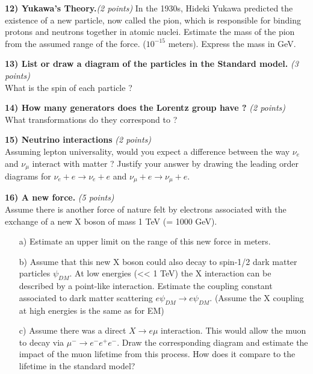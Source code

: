 {\vspace*{1.5in}

\textbf{12) Yukawa’s Theory.}\hfill \textit{(2 points)}
In the 1930s, Hideki Yukawa predicted the existence of a new particle, now called the pion, which is responsible for binding protons and neutrons together in atomic nuclei. 
Estimate the mass of the pion from the assumed range of the force. ($10^{-15}$ meters). 
Express the mass in GeV.

\clearpage



\textbf{13) List or draw a diagram of the particles in the Standard model. } \hfill \textit{(3 points)}\\
What is the spin of each particle ?

\vspace*{3in}

\textbf{14)  How many generators does the Lorentz group have ? }\hfill \textit{(2 points)}\\
What transformations do they correspond to ?

\vspace*{2in}

\textbf{15) Neutrino interactions } \hfill \textit{(2 points)}\\
Assuming lepton universality, would you expect a difference between the way $\nu_e$ and $\nu_\mu$ interact with matter ?
Justify your answer by drawing the leading order diagrams for $\nu_e + e \rightarrow \nu_e + e$  and $\nu_\mu + e \rightarrow \nu_\mu + e$.

\vspace*{0.25in}


\clearpage

\textbf{16) A new force. } \hfill \textit{(5 points)}\\
Assume there is another force of nature felt by electrons associated with the exchange of a new X boson of mass 1 TeV (= 1000 GeV).
\begin{itemize}
\item[a)]{ Estimate an upper limit on the range of this new force in meters.
\vspace{2in}
}
\item[b)]{ Assume that this new X boson could also decay to spin-1/2 dark matter particles $\psi_{DM}$. At low energies (<< 1 TeV) the X interaction can be described by a point-like interaction. Estimate the coupling constant associated to dark matter scattering $e \psi_{DM} \rightarrow e \psi_{DM}$.   (Assume the X coupling at high energies is the same as for EM)  }
\vspace*{2in}
\item[c)]{ Assume there was a direct $X\rightarrow e\mu$ interaction. This would allow the muon to decay via $\mu^- \rightarrow e^-e^+e^-$. Draw the corresponding diagram and estimate the impact of the muon lifetime from this process.  How does it compare to the lifetime in the standard model?     }
\end{itemize}






} %

